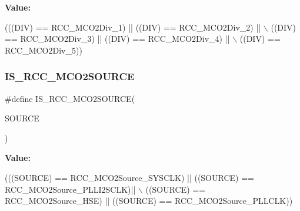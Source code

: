 {\bfseries Value\+:}
\begin{DoxyCode}
(((DIV) == RCC\_MCO2Div\_1) || ((DIV) == RCC\_MCO2Div\_2) || \(\backslash\)
                             ((DIV) == RCC\_MCO2Div\_3) || ((DIV) == RCC\_MCO2Div\_4) || \(\backslash\)
                             ((DIV) == RCC\_MCO2Div\_5))
\end{DoxyCode}
\mbox{\label{group___r_c_c___m_c_o2___clock___source___prescaler_ga99f4a9acbacb5e4d2b27bb9f4f2c0a2f}} 
\subsubsection{\texorpdfstring{I\+S\+\_\+\+R\+C\+C\+\_\+\+M\+C\+O2\+S\+O\+U\+R\+CE}{IS\_RCC\_MCO2SOURCE}}
{\footnotesize\ttfamily \#define I\+S\+\_\+\+R\+C\+C\+\_\+\+M\+C\+O2\+S\+O\+U\+R\+CE(\begin{DoxyParamCaption}\item[{}]{S\+O\+U\+R\+CE }\end{DoxyParamCaption})}

{\bfseries Value\+:}
\begin{DoxyCode}
(((SOURCE) == RCC\_MCO2Source\_SYSCLK) || ((SOURCE) == RCC\_MCO2Source\_PLLI2SCLK)|| \(\backslash\)
                                   ((SOURCE) == RCC\_MCO2Source\_HSE) || ((SOURCE) == RCC\_MCO2Source\_PLLCLK))
\end{DoxyCode}
